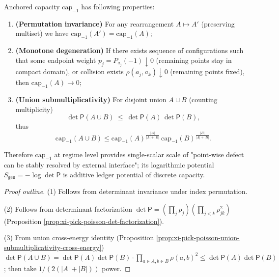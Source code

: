 \begin{proposition}\label{prop:xi-anchored-capacity-three-properties}
Anchored capacity \(\mathrm{cap}_{-1}\) has following properties:
\begin{enumerate}
  \item \textbf{(Permutation invariance)} For any rearrangement \(A\mapsto A'\) (preserving multiset) we have \(\mathrm{cap}_{-1}(A')=\mathrm{cap}_{-1}(A)\);
  \item \textbf{(Monotone degeneration)} If there exists sequence of configurations such that some endpoint weight \(p_j=P_{a_j}(-1)\downarrow 0\) (remaining points stay in compact domain), or collision exists \(\rho(a_j,a_k)\downarrow 0\) (remaining points fixed), then \(\mathrm{cap}_{-1}(A)\to 0\);
  \item \textbf{(Union submultiplicativity)} For disjoint union \(A\sqcup B\) (counting multiplicity)
  \[
  \det\mathsf P(A\cup B)\ \le\ \det\mathsf P(A)\,\det\mathsf P(B),
  \]
  thus
  \[
  \boxed{\;
  \mathrm{cap}_{-1}(A\cup B)
  \le
  \mathrm{cap}_{-1}(A)^{\frac{|A|}{|A|+|B|}}\,
  \mathrm{cap}_{-1}(B)^{\frac{|B|}{|A|+|B|}}.\;}
  \]
\end{enumerate}
Therefore \(\mathrm{cap}_{-1}\) at regime level provides single-scalar scale of "point-wise defect can be stably resolved by external interface"; its logarithmic potential \(S_{\mathrm{gen}}=-\log\det\mathsf P\) is additive ledger potential of discrete capacity.
\end{proposition}
\begin{proof}[Proof outline]
(1) Follows from determinant invariance under index permutation.
\par
(2) Follows from determinant factorization \(\det\mathsf P=(\prod_j p_j)(\prod_{j<k}\rho_{jk}^2)\) (Proposition \ref{prop:xi-pick-poisson-det-factorization}).
\par
(3) From union cross-energy identity (Proposition \ref{prop:xi-pick-poisson-union-submultiplicativity-cross-energy})
\(
\det\mathsf P(A\cup B)=\det\mathsf P(A)\det\mathsf P(B)\cdot \prod_{a\in A,b\in B}\rho(a,b)^2
\le \det\mathsf P(A)\det\mathsf P(B)
\);
then take \(1/(2(|A|+|B|))\) power.
\end{proof}

